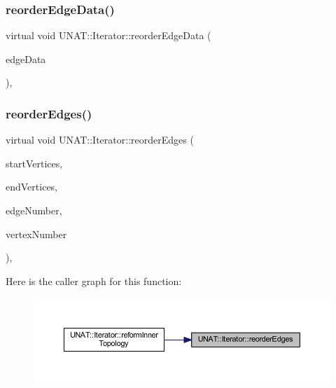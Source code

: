 \subsubsection{\texorpdfstring{reorderEdgeData()}{reorderEdgeData()}\hspace{0.1cm}{\footnotesize\ttfamily [2/2]}}
{\footnotesize\ttfamily virtual void U\+N\+A\+T\+::\+Iterator\+::reorder\+Edge\+Data (\begin{DoxyParamCaption}\item[{\mbox{\hyperlink{structArrays}{Arrays}} $\ast$}]{edge\+Data }\end{DoxyParamCaption})\hspace{0.3cm}{\ttfamily [inline]}, {\ttfamily [virtual]}}

\mbox{\label{classUNAT_1_1Iterator_a12e23a0188bf8c4a7d3de798ee9aa85f}} 
\subsubsection{\texorpdfstring{reorderEdges()}{reorderEdges()}\hspace{0.1cm}{\footnotesize\ttfamily [1/2]}}
{\footnotesize\ttfamily virtual void U\+N\+A\+T\+::\+Iterator\+::reorder\+Edges (\begin{DoxyParamCaption}\item[{\mbox{\hyperlink{include_2swMacro_8h_a113cf5f6b5377cdf3fac6aa4e443e9aa}{sw\+Int}} $\ast$}]{start\+Vertices,  }\item[{\mbox{\hyperlink{include_2swMacro_8h_a113cf5f6b5377cdf3fac6aa4e443e9aa}{sw\+Int}} $\ast$}]{end\+Vertices,  }\item[{\mbox{\hyperlink{include_2swMacro_8h_a113cf5f6b5377cdf3fac6aa4e443e9aa}{sw\+Int}}}]{edge\+Number,  }\item[{\mbox{\hyperlink{include_2swMacro_8h_a113cf5f6b5377cdf3fac6aa4e443e9aa}{sw\+Int}}}]{vertex\+Number }\end{DoxyParamCaption})\hspace{0.3cm}{\ttfamily [inline]}, {\ttfamily [virtual]}}

Here is the caller graph for this function\+:
\nopagebreak
\begin{figure}[H]
\begin{center}
\leavevmode
\includegraphics[width=350pt]{classUNAT_1_1Iterator_a12e23a0188bf8c4a7d3de798ee9aa85f_icgraph}
\end{center}
\end{figure}
\mbox{\label{classUNAT_1_1Iterator_a12e23a0188bf8c4a7d3de798ee9aa85f}} 
